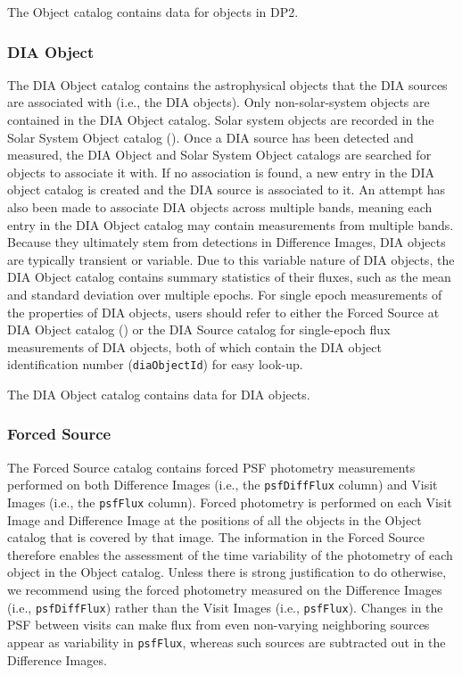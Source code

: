 The Object catalog contains data for \nobjects objects in \gls{DP2}.

\subsubsection{DIA Object}
\label{sssec:diaobject}
The \gls{DIA} Object catalog contains the astrophysical objects that the \gls{DIA} sources are associated with (i.e., the \gls{DIA} objects).
Only non-solar-system objects are contained in the \gls{DIA} Object catalog.
Solar system objects are recorded in the Solar System Object catalog ().
Once a \gls{DIA} source has been detected and measured, the \gls{DIA} Object and Solar System Object catalogs are searched for objects to associate it with.
If no association is found, a new entry in the \gls{DIA} object catalog is created and the \gls{DIA} source is associated to it.
An attempt has also been made to associate \gls{DIA} objects across multiple bands, meaning each entry in the \gls{DIA} Object catalog may contain measurements from multiple bands.
Because they ultimately stem from detections in Difference Images, DIA objects are typically \gls{transient} or variable.
Due to this variable nature of DIA objects, the DIA Object catalog contains summary statistics of their fluxes, such as the mean and standard deviation over multiple epochs.
For single epoch measurements of the properties of DIA objects, users should refer to either the Forced Source at DIA Object catalog () or the DIA Source catalog for single-epoch \gls{flux} measurements of DIA objects, both of which contain the DIA object identification number (\texttt{diaObjectId}) for easy look-up.

The \gls{DIA} Object catalog contains data for \ndiaobjects \gls{DIA} objects.

\subsubsection{Forced Source}
The Forced Source catalog contains forced \gls{PSF} photometry measurements performed on both Difference Images (i.e., the \texttt{psfDiffFlux} column) and Visit Images (i.e., the \texttt{psfFlux} column).
Forced photometry is performed on each Visit Image and Difference Image at the positions of all the objects in the Object catalog that is covered by that image.
The information in the Forced Source therefore enables the assessment of the time variability of the photometry of each object in the Object catalog.
Unless there is strong justification to do otherwise, we recommend using the forced photometry measured on the Difference Images (i.e., \texttt{psfDiffFlux}) rather than the Visit Images (i.e., \texttt{psfFlux}).
Changes in the \gls{PSF} between visits can make flux from even non-varying neighboring sources appear as variability in \texttt{psfFlux}, whereas such sources are subtracted out in the Difference Images.



